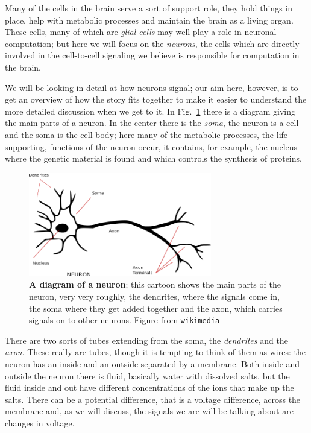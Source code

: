 \documentclass[12pt]{article}
\begin{document}
Many of the cells in the brain serve a sort of support role, they hold
things in place, help with metabolic processes and maintain the brain
as a living organ. These cells, many of which are \textsl{glial cells}
may well play a role in neuronal computation; but here we will focus
on the \textsl{neurons}, the cells which are directly involved in the
cell-to-cell signaling we believe is responsible for computation in
the brain.

We will be looking in detail at how neurons signal; our aim here,
however, is to get an overview of how the story fits together to make
it easier to understand the more detailed discussion when we get to
it. In Fig.~\ref{fig_neuron} there is a diagram giving the main parts
of a neuron. In the center there is the \textsl{soma}, the neuron is a
cell and the soma is the cell body; here many of the metabolic
processes, the life-supporting, functions of the neuron occur, it
contains, for example, the nucleus where the genetic material is found
and which controls the synthesis of proteins. 

\begin{figure}[tbhp]
  \begin{center}
    \includegraphics[width=8cm]{neuron.png}
    \end{center}
  \caption{\textbf{A diagram of a neuron}; this cartoon shows the main parts of the neuron, very very roughly, the dendrites, where the signals come in, the soma where they get added together and the axon, which carries signals on to other neurons. Figure from \texttt{wikimedia}\label{fig_neuron}}
\end{figure}

There are two sorts of tubes extending from the soma, the
\textsl{dendrites} and the \textsl{axon}. These really are tubes,
though it is tempting to think of them as wires: the neuron has an
inside and an outside separated by a membrane. Both inside and outside
the neuron there is fluid, basically water with dissolved salts, but
the fluid inside and out have different concentrations of the ions
that make up the salts. There can be a potential difference, that is a
voltage difference, across the membrane and, as we will discuss, the
signals we are will be talking about are changes in voltage.
\end{document}
